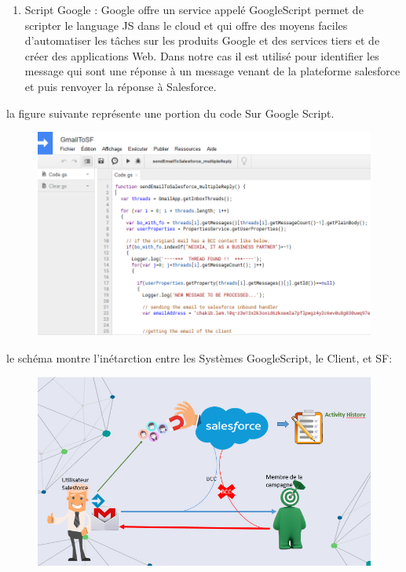 \documentclass[a4paper, 12pt]{report}
\begin{document}
\begin{itemize}
\begin{enumerate}
 
\item Script Google  : Google offre un service appelé GoogleScript permet de  scripter le language JS dans le cloud  et qui offre des moyens faciles d'automatiser les tâches sur les produits Google et des services tiers et de créer des applications Web. Dans notre cas il est utilisé pour identifier les message qui sont une réponse à un message venant de la plateforme salesforce et puis renvoyer la réponse à Salesforce.
\end{enumerate}
la figure suivante représente une portion du code Sur Google Script.
\begin{figure}[H]
	\centering
		\includegraphics[scale=0.7]{googlescript.PNG}
	\label{fig:googlescript}
\end{figure}
le schéma montre l'inétarction entre les Systèmes GoogleScript, le Client, et SF:
\begin{figure}[H]
	\centering
		\includegraphics[scale=0.7]{EmailMarketing.PNG}
	\label{fig:EmailMarketing}
\end{figure}


\end{itemize}
\end{document}
